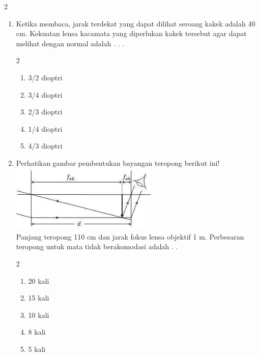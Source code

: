 \documentclass[10pt,a4paper]{extarticle}
\newcommand{\pilgani}[1]{                            \vspace{-0.3cm}\begin{multicols}{2}
 \begin{enumerate}[label=\Alph*., itemsep=0pt,topsep=0pt,leftmargin=*,align=Center]#1                     \end{enumerate}
 \phantom{ini cuma sapi, wedus, dan ayam}
 \end{multicols}}
\begin{document}
\begin{multicols*}{2}
\begin{enumerate}
\item Ketika membaca, jarak terdekat yang dapat dilihat seroang kakek adalah 40 cm. Kekuatan lensa kacamata yang diperlukan kakek tersebut agar dapat melihat dengan normal adalah . . .
\pilgani{
	\item 3/2 dioptri
	\item 3/4 dioptri
	\item 2/3 dioptri
	\item 1/4 dioptri
	\item 4/3 dioptri}
\vspace{3cm}
%
\vspace{3cm}
\item Perhatikan gambar pembentukan bayangan teropong berikut ini!\\
\includegraphics[width=7cm]{pic/bayangan-teropong}\\
Panjang teropong 110 cm dan jarak fokus lensa objektif 1 m. Perbesaran teropong untuk mata tidak berakomodasi adalah . . 
\pilgani{
	\item 20 kali
	\item 15 kali
	\item 10 kali
	\item 8 kali
	\item 5 kali }
\vspace{3cm}



\end{enumerate}
\end{multicols*}
\end{document}
